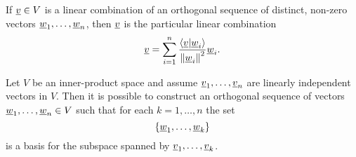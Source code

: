 \begin{corollary}
If $\underline{v} \in V$ is a linear combination of an orthogonal sequence of distinct, non-zero vectors $\underline{w}_1, \ldots, \underline{w}_n$, then $\underline{v}$ is the particular linear combination
\begin{equation*}
\underline{v} = \sum_{i = 1}^n \frac{ \left\langle \underline{v} | \underline{w}_i \right\rangle } { \left\| \underline{w}_i \right\|^2 } \underline{w}_i.
\end{equation*}
\end{corollary}

\begin{theorem}
Let $V$ be an inner-product space and assume $\underline{v}_1, \ldots, \underline{v}_n$ are linearly independent vectors in $V$.
Then it is possible to construct an orthogonal sequence of vectors $\underline{w}_1, \ldots, \underline{w}_n \in V$ such that for each $k = 1, \ldots, n$ the set
\begin{equation*}
\left\{ \underline{w}_1, \ldots, \underline{w}_k \right\}
\end{equation*}
is a basis for the subspace spanned by $\underline{v}_1, \ldots, \underline{v}_k$.
\end{theorem}
